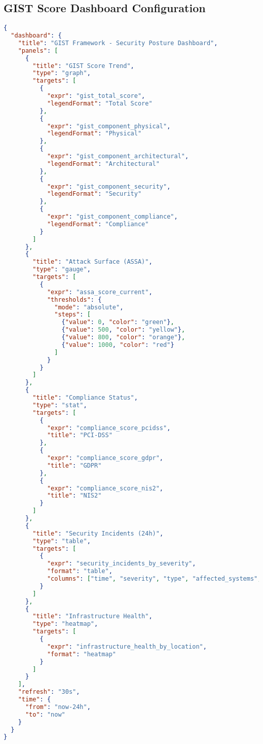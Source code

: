 \subsection{\texorpdfstring{GIST Score Dashboard Configuration}{D.4.1 - GIST Score Dashboard Configuration}}
\begin{lstlisting}[language=json, caption=Configurazione Grafana per GIST Score Dashboard]
{
  "dashboard": {
    "title": "GIST Framework - Security Posture Dashboard",
    "panels": [
      {
        "title": "GIST Score Trend",
        "type": "graph",
        "targets": [
          {
            "expr": "gist_total_score",
            "legendFormat": "Total Score"
          },
          {
            "expr": "gist_component_physical",  
            "legendFormat": "Physical"
          },
          {
            "expr": "gist_component_architectural",
            "legendFormat": "Architectural"  
          },
          {
            "expr": "gist_component_security",
            "legendFormat": "Security"
          },
          {
            "expr": "gist_component_compliance",
            "legendFormat": "Compliance"
          }
        ]
      },
      {
        "title": "Attack Surface (ASSA)",
        "type": "gauge",
        "targets": [
          {
            "expr": "assa_score_current",
            "thresholds": {
              "mode": "absolute",
              "steps": [
                {"value": 0, "color": "green"},
                {"value": 500, "color": "yellow"},
                {"value": 800, "color": "orange"},
                {"value": 1000, "color": "red"}
              ]
            }
          }
        ]
      },
      {
        "title": "Compliance Status",
        "type": "stat",
        "targets": [
          {
            "expr": "compliance_score_pcidss",
            "title": "PCI-DSS"
          },
          {
            "expr": "compliance_score_gdpr",
            "title": "GDPR"
          },
          {
            "expr": "compliance_score_nis2",
            "title": "NIS2"
          }
        ]
      },
      {
        "title": "Security Incidents (24h)",
        "type": "table",
        "targets": [
          {
            "expr": "security_incidents_by_severity",
            "format": "table",
            "columns": ["time", "severity", "type", "affected_systems", "status"]
          }
        ]
      },
      {
        "title": "Infrastructure Health",
        "type": "heatmap",
        "targets": [
          {
            "expr": "infrastructure_health_by_location",
            "format": "heatmap"
          }
        ]
      }
    ],
    "refresh": "30s",
    "time": {
      "from": "now-24h",
      "to": "now"
    }
  }
}
\end{lstlisting}